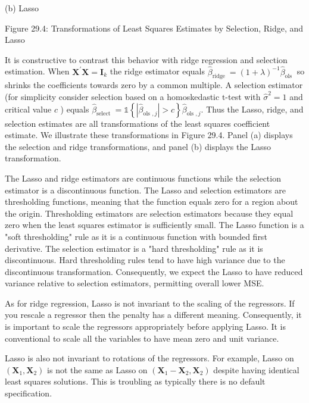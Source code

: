 \documentclass[10pt]{article}
\begin{document}
(b) Lasso

Figure 29.4: Transformations of Least Squares Estimates by Selection, Ridge, and Lasso

It is constructive to contrast this behavior with ridge regression and selection estimation. When $\boldsymbol{X}^{\prime} \boldsymbol{X}=\boldsymbol{I}_{k}$ the ridge estimator equals $\widehat{\beta}_{\text {ridge }}=(1+\lambda)^{-1} \widehat{\beta}_{\text {ols }}$ so shrinks the coefficients towards zero by a common multiple. A selection estimator (for simplicity consider selection based on a homoskedastic $\mathrm{t}$-test with $\widehat{\sigma}^{2}=1$ and critical value $c$ ) equals $\widehat{\beta}_{\text {select }}=\mathbb{1}\left\{\left|\widehat{\beta}_{\text {ols }, j}\right|>c\right\} \widehat{\beta}_{\text {ols }, j}$. Thus the Lasso, ridge, and selection estimates are all transformations of the least squares coefficient estimate. We illustrate these transformations in Figure 29.4. Panel (a) displays the selection and ridge transformations, and panel (b) displays the Lasso transformation.

The Lasso and ridge estimators are continuous functions while the selection estimator is a discontinuous function. The Lasso and selection estimators are thresholding functions, meaning that the function equals zero for a region about the origin. Thresholding estimators are selection estimators because they equal zero when the least squares estimator is sufficiently small. The Lasso function is a "soft thresholding" rule as it is a continuous function with bounded first derivative. The selection estimator is a "hard thresholding" rule as it is discontinuous. Hard thresholding rules tend to have high variance due to the discontinuous transformation. Consequently, we expect the Lasso to have reduced variance relative to selection estimators, permitting overall lower MSE.

As for ridge regression, Lasso is not invariant to the scaling of the regressors. If you rescale a regressor then the penalty has a different meaning. Consequently, it is important to scale the regressors appropriately before applying Lasso. It is conventional to scale all the variables to have mean zero and unit variance.

Lasso is also not invariant to rotations of the regressors. For example, Lasso on $\left(\boldsymbol{X}_{1}, \boldsymbol{X}_{2}\right)$ is not the same as Lasso on $\left(\boldsymbol{X}_{1}-\boldsymbol{X}_{2}, \boldsymbol{X}_{2}\right)$ despite having identical least squares solutions. This is troubling as typically there is no default specification.
\end{document}
